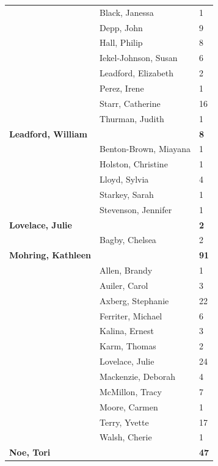 \documentclass{article}\usepackage[]{graphicx}\usepackage[]{color}
\begin{document}
{\begin{longtable} { >{\raggedright}p{}|p{}p{}}
   & Black, Janessa & 1 \\ 
   & Depp, John & 9 \\ 
   \rowcolor[gray]{0.90} & Hall, Philip & 8 \\ 
   \rowcolor[gray]{0.90} & Iekel-Johnson, Susan & 6 \\ 
   \rowcolor[gray]{0.90} & Leadford, Elizabeth & 2 \\ 
   & Perez, Irene & 1 \\ 
   & Starr, Catherine & 16 \\ 
   & Thurman, Judith & 1 \\ 
   \rowcolor[gray]{0.90}\textbf{Leadford, William} &  & \hspace{2cm}\textbf{8} \\ 
   \rowcolor[gray]{0.90} & Benton-Brown, Miayana & 1 \\ 
   \rowcolor[gray]{0.90} & Holston, Christine & 1 \\ 
   & Lloyd, Sylvia & 4 \\ 
   & Starkey, Sarah & 1 \\ 
   & Stevenson, Jennifer & 1 \\ 
   \rowcolor[gray]{0.90}\textbf{Lovelace, Julie} &  & \hspace{2cm}\textbf{2} \\ 
   \rowcolor[gray]{0.90} & Bagby, Chelsea & 2 \\ 
   \rowcolor[gray]{0.90}\textbf{Mohring, Kathleen} &  & \hspace{2cm}\textbf{91} \\ 
   & Allen, Brandy & 1 \\ 
   & Auiler, Carol & 3 \\ 
   & Axberg, Stephanie & 22 \\ 
   \rowcolor[gray]{0.90} & Ferriter, Michael & 6 \\ 
   \rowcolor[gray]{0.90} & Kalina, Ernest & 3 \\ 
   \rowcolor[gray]{0.90} & Karm, Thomas & 2 \\ 
   & Lovelace, Julie & 24 \\ 
   & Mackenzie, Deborah & 4 \\ 
   & McMillon, Tracy & 7 \\ 
   \rowcolor[gray]{0.90} & Moore, Carmen & 1 \\ 
   \rowcolor[gray]{0.90} & Terry, Yvette & 17 \\ 
   \rowcolor[gray]{0.90} & Walsh, Cherie & 1 \\ 
  \textbf{Noe, Tori} &  & \hspace{2cm}\textbf{47} \\ 

\end{longtable}}
\end{document}
